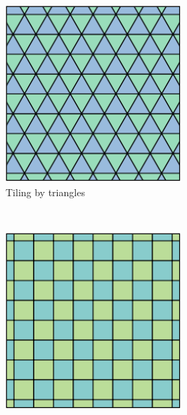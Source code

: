 \documentclass[]{article}
\begin{document}
\begin{figure}
        \centering
        \begin{subfigure}[hb]{0.3\textwidth}
                \includegraphics[width=\textwidth]{triangle}
                \caption{Tiling by triangles}
                \label{fig:triangle}
        \end{subfigure}%
        ~ %
        \begin{subfigure}[hb]{0.3\textwidth}
                \includegraphics[width=\textwidth]{square}

\end{subfigure}
\end{figure}
\end{document}
